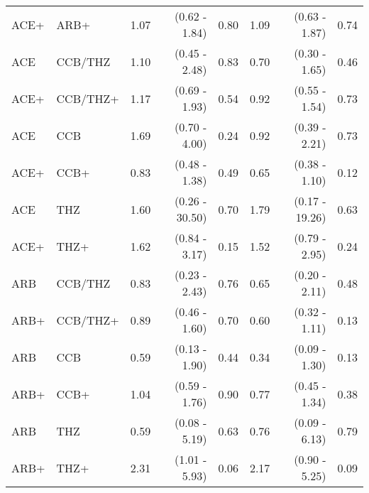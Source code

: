 \documentclass[11pt,]{article}
\begin{document}
\begin{table}[H]
{\begin{tabular}{llrrrrrr}
  ACE+ & ARB+ & 1.07 & (0.62 - 1.84) & 0.80 & 1.09 & (0.63 - 1.87) & 0.74 \\ 
  ACE & CCB/THZ & 1.10 & (0.45 - 2.48) & 0.83 & 0.70 & (0.30 - 1.65) & 0.46 \\ 
  ACE+ & CCB/THZ+ & 1.17 & (0.69 - 1.93) & 0.54 & 0.92 & (0.55 - 1.54) & 0.73 \\ 
  ACE & CCB & 1.69 & (0.70 - 4.00) & 0.24 & 0.92 & (0.39 - 2.21) & 0.73 \\ 
  ACE+ & CCB+ & 0.83 & (0.48 - 1.38) & 0.49 & 0.65 & (0.38 - 1.10) & 0.12 \\ 
  ACE & THZ & 1.60 & (0.26 - 30.50) & 0.70 & 1.79 & (0.17 - 19.26) & 0.63 \\ 
  ACE+ & THZ+ & 1.62 & (0.84 - 3.17) & 0.15 & 1.52 & (0.79 - 2.95) & 0.24 \\ 
  ARB & CCB/THZ & 0.83 & (0.23 - 2.43) & 0.76 & 0.65 & (0.20 - 2.11) & 0.48 \\ 
  ARB+ & CCB/THZ+ & 0.89 & (0.46 - 1.60) & 0.70 & 0.60 & (0.32 - 1.11) & 0.13 \\ 
  ARB & CCB & 0.59 & (0.13 - 1.90) & 0.44 & 0.34 & (0.09 - 1.30) & 0.13 \\ 
  ARB+ & CCB+ & 1.04 & (0.59 - 1.76) & 0.90 & 0.77 & (0.45 - 1.34) & 0.38 \\ 
  ARB & THZ & 0.59 & (0.08 - 5.19) & 0.63 & 0.76 & (0.09 - 6.13) & 0.79 \\ 
  ARB+ & THZ+ & 2.31 & (1.01 - 5.93) & 0.06 & 2.17 & (0.90 - 5.25) & 0.09 \\ 
    \bottomrule
  \end{tabular}
  }
\end{table}
\end{document}
